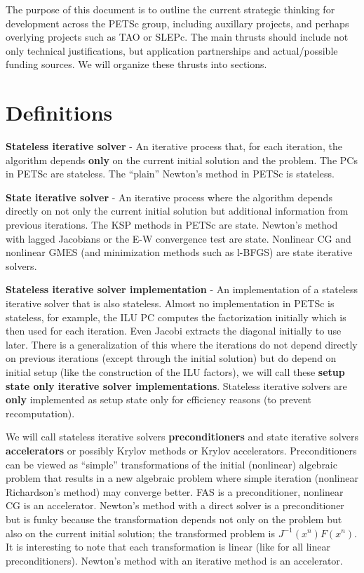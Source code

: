 	The purpose of this document is to outline the current strategic thinking for development across the PETSc
group, including auxillary projects, and perhaps overlying projects such as TAO or SLEPc. The main thrusts should
include not only technical justifications, but application partnerships and actual/possible funding sources. We will
organize these thrusts into sections.

\section{Definitions}

   {\bf Stateless iterative solver} - An iterative process that, for each iteration, the algorithm depends {\bf only}
on the current initial solution and the problem. The PCs in PETSc are stateless. The ``plain'' Newton's method in
PETSc is stateless.

   {\bf State iterative solver} - An iterative process where the algorithm depends directly on not only the current
initial solution but additional information from previous iterations. The KSP methods in PETSc are state. Newton's method
with lagged Jacobians or the E-W convergence test are state. Nonlinear CG and nonlinear GMES (and minimization methods
such as l-BFGS) are state iterative solvers.

   {\bf Stateless iterative solver implementation} - An implementation of a stateless iterative solver that is also
stateless. Almost no implementation in PETSc is stateless, for example, the ILU PC computes the factorization initially
which is then used for each iteration. Even Jacobi extracts the diagonal initially to use later. There is a generalization
of this where the iterations do not depend directly on previous iterations (except through the initial solution) but
do depend on initial setup (like the construction of the ILU factors), we will call these {\bf setup state only iterative solver
implementations}. Stateless iterative solvers are {\bf only}
implemented as setup state only for efficiency reasons (to prevent recomputation).

  We will call stateless iterative solvers {\bf preconditioners} and state iterative solvers {\bf accelerators} or
possibly Krylov methods or Krylov accelerators. Preconditioners can be viewed as ``simple'' transformations of the initial
(nonlinear) algebraic problem that results in a new algebraic problem where simple iteration (nonlinear Richardson's method)
may converge better. FAS is a preconditioner, nonlinear CG is an accelerator. Newton's method with a direct solver is a preconditioner but is
funky because the transformation depends not only on the problem but also on the current initial solution; the transformed
problem is $ J^{-1}(x^{n}) F(x^n)$. It is interesting to note that each transformation is linear (like for all linear preconditioners).
Newton's method with an iterative method is an accelerator.



